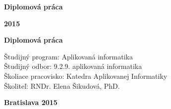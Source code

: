 \begin{center}
\centerline{\Large\sc\textbf\skola}
\sc\Large\textbf\fakulta
\end{center}

\vspace*{8cm}

\begin{center}
\begin{minipage}{0.8\textwidth}
\begin{center}
 \LARGE\sc\textbf\nazov
 \vspace{1em}
 \centerline{\Large\bf Diplomová práca}
\end{center}
\end{minipage}
\end{center}

\vfill
\noindent
 {\bf 2015}  \hfill {\bf \autor}
\thispagestyle{empty}



\newpage
\begin{center}
\centerline{\Large\sc\textbf\skola}
\sc\Large\textbf\fakulta
\end{center}

\vspace*{8cm}

\begin{center}
\begin{minipage}{0.8\textwidth}
\begin{center}
 \LARGE\sc\textbf\nazov 
\end{center}
\vspace{1em}
\centerline{\Large\bf Diplomová práca}
\end{minipage}
\end{center}

\vspace{5cm}

\linespread{1.3}%
\selectfont

\noindent
Študijný program: \hspace{0.8em} Aplikovaná informatika\\
Študijný odbor:  \hspace{1.85em} 9.2.9. aplikovaná informatika\\
Školiace pracovisko: Katedra Aplikovanej Informatiky\\
Školiteľ:  \hspace{4.6em} RNDr. Elena Šikudová, PhD.


\vfill
\noindent
{\bf Bratislava 2015}  \hfill {\bf \autor}
\thispagestyle{empty}

